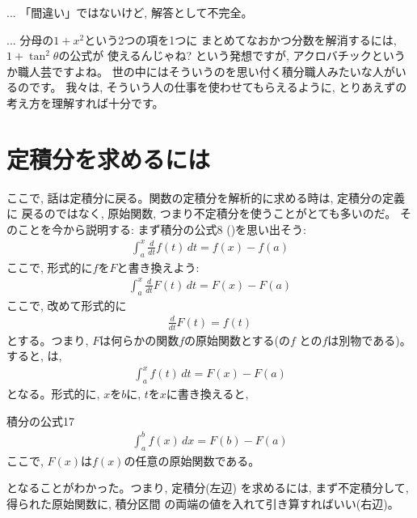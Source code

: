 \begin{freqmiss}{\small{} ... 「間違い」ではないけど, 
解答として不完全。}\end{freqmiss}

\begin{faq}{\small{} ... 分母の$1+x^2$という2つの項を1つに
まとめてなおかつ分数を解消するには, $1+\tan^2\theta$の公式が
使えるんじゃね? という発想ですが, アクロバチックというか職人芸ですよね。
世の中にはそういうのを思い付く積分職人みたいな人がいるのです。
我々は, そういう人の仕事を使わせてもらえるように, 
とりあえずの考え方を理解すれば十分です。
}\end{faq}
\vv



\section{定積分を求めるには}

ここで, 話は定積分に戻る。関数の定積分を解析的に求める時は, 定積分の定義に
戻るのではなく, 原始関数, つまり不定積分を使うことがとても多いのだ。
そのことを今から説明する: まず積分の公式8 ()を思い出そう:
\begin{eqnarray}
\int_{a}^{x}\frac{d}{dt}f(t)\, dt=f(x)-f(a)\label{eq:futei_teisekibun1}
\end{eqnarray}
ここで, 形式的に$f$を$F$と書き換えよう:
\begin{eqnarray}
\int_{a}^{x}\frac{d}{dt}F(t)\, dt=F(x)-F(a)\label{eq:futei_teisekibun2}
\end{eqnarray}
ここで, 改めて形式的に
\begin{eqnarray}
\frac{d}{dt}F(t)=f(t)\label{eq:futei_teisekibun3}
\end{eqnarray}
とする。つまり, $F$は何らかの関数$f$の原始関数とする(の$f$
との$f$は別物である)。すると, は, 
\begin{eqnarray}
\int_{a}^{x}f(t)\, dt=F(x)-F(a)\label{eq:futei_teisekibun4}
\end{eqnarray}
となる。形式的に, $x$を$b$に, $t$を$x$に書き換えると, 

\begin{itembox}{積分の公式17}
\begin{eqnarray}
\int_{a}^{b}f(x)\,dx=F(b)-F(a)\label{eq:int_Fa_Fb}
\end{eqnarray}
ここで, $F(x)$は$f(x)$の任意の原始関数である。
\end{itembox}
となることがわかった。つまり, 定積分(左辺)
を求めるには, まず不定積分して, 得られた原始関数に, 積分区間
の両端の値を入れて引き算すればいい(右辺)。\hv

